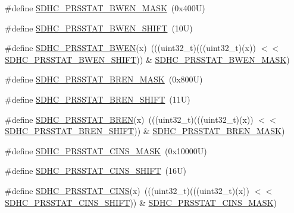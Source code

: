 \begin{DoxyCompactItemize}
\#define \mbox{\hyperlink{group___s_d_h_c___register___masks_ga59c9cd5ee08a703b51a4487e721cfdac}{S\+D\+H\+C\+\_\+\+P\+R\+S\+S\+T\+A\+T\+\_\+\+B\+W\+E\+N\+\_\+\+M\+A\+SK}}~(0x400\+U)
\item 
\#define \mbox{\hyperlink{group___s_d_h_c___register___masks_ga2a8af22b9f8230f46db9118a7f4a2f62}{S\+D\+H\+C\+\_\+\+P\+R\+S\+S\+T\+A\+T\+\_\+\+B\+W\+E\+N\+\_\+\+S\+H\+I\+FT}}~(10\+U)
\item 
\#define \mbox{\hyperlink{group___s_d_h_c___register___masks_gaef01b933a9fdd1f2fb756847dab90a09}{S\+D\+H\+C\+\_\+\+P\+R\+S\+S\+T\+A\+T\+\_\+\+B\+W\+EN}}(x)~(((uint32\+\_\+t)(((uint32\+\_\+t)(x)) $<$$<$ \mbox{\hyperlink{group___s_d_h_c___register___masks_ga2a8af22b9f8230f46db9118a7f4a2f62}{S\+D\+H\+C\+\_\+\+P\+R\+S\+S\+T\+A\+T\+\_\+\+B\+W\+E\+N\+\_\+\+S\+H\+I\+FT}})) \& \mbox{\hyperlink{group___s_d_h_c___register___masks_ga59c9cd5ee08a703b51a4487e721cfdac}{S\+D\+H\+C\+\_\+\+P\+R\+S\+S\+T\+A\+T\+\_\+\+B\+W\+E\+N\+\_\+\+M\+A\+SK}})
\item 
\#define \mbox{\hyperlink{group___s_d_h_c___register___masks_ga9a1a3466ff4e6ec9067956296e917ebf}{S\+D\+H\+C\+\_\+\+P\+R\+S\+S\+T\+A\+T\+\_\+\+B\+R\+E\+N\+\_\+\+M\+A\+SK}}~(0x800\+U)
\item 
\#define \mbox{\hyperlink{group___s_d_h_c___register___masks_ga755afbadcc686b9a04f531081c5fb811}{S\+D\+H\+C\+\_\+\+P\+R\+S\+S\+T\+A\+T\+\_\+\+B\+R\+E\+N\+\_\+\+S\+H\+I\+FT}}~(11\+U)
\item 
\#define \mbox{\hyperlink{group___s_d_h_c___register___masks_ga249f62f44ab8731ade73bfedc6d42501}{S\+D\+H\+C\+\_\+\+P\+R\+S\+S\+T\+A\+T\+\_\+\+B\+R\+EN}}(x)~(((uint32\+\_\+t)(((uint32\+\_\+t)(x)) $<$$<$ \mbox{\hyperlink{group___s_d_h_c___register___masks_ga755afbadcc686b9a04f531081c5fb811}{S\+D\+H\+C\+\_\+\+P\+R\+S\+S\+T\+A\+T\+\_\+\+B\+R\+E\+N\+\_\+\+S\+H\+I\+FT}})) \& \mbox{\hyperlink{group___s_d_h_c___register___masks_ga9a1a3466ff4e6ec9067956296e917ebf}{S\+D\+H\+C\+\_\+\+P\+R\+S\+S\+T\+A\+T\+\_\+\+B\+R\+E\+N\+\_\+\+M\+A\+SK}})
\item 
\#define \mbox{\hyperlink{group___s_d_h_c___register___masks_ga48dc8b20e5092e223a378a1cba4803d1}{S\+D\+H\+C\+\_\+\+P\+R\+S\+S\+T\+A\+T\+\_\+\+C\+I\+N\+S\+\_\+\+M\+A\+SK}}~(0x10000\+U)
\item 
\#define \mbox{\hyperlink{group___s_d_h_c___register___masks_ga3aaccd62a11f1cd2f842cd8d5f50ba79}{S\+D\+H\+C\+\_\+\+P\+R\+S\+S\+T\+A\+T\+\_\+\+C\+I\+N\+S\+\_\+\+S\+H\+I\+FT}}~(16\+U)
\item 
\#define \mbox{\hyperlink{group___s_d_h_c___register___masks_ga0ac32d41f5a6c3adba93ca66e239d167}{S\+D\+H\+C\+\_\+\+P\+R\+S\+S\+T\+A\+T\+\_\+\+C\+I\+NS}}(x)~(((uint32\+\_\+t)(((uint32\+\_\+t)(x)) $<$$<$ \mbox{\hyperlink{group___s_d_h_c___register___masks_ga3aaccd62a11f1cd2f842cd8d5f50ba79}{S\+D\+H\+C\+\_\+\+P\+R\+S\+S\+T\+A\+T\+\_\+\+C\+I\+N\+S\+\_\+\+S\+H\+I\+FT}})) \& \mbox{\hyperlink{group___s_d_h_c___register___masks_ga48dc8b20e5092e223a378a1cba4803d1}{S\+D\+H\+C\+\_\+\+P\+R\+S\+S\+T\+A\+T\+\_\+\+C\+I\+N\+S\+\_\+\+M\+A\+SK}})
$$
\end{DoxyCompactItemize}
